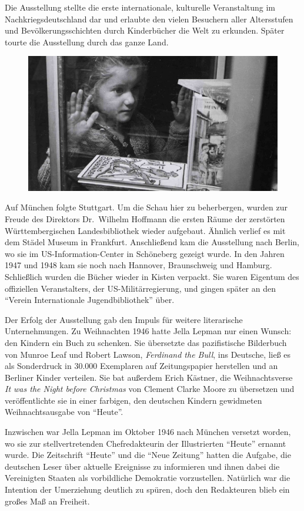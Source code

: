 \documentclass[a4paper,
fontsize=11pt,
oneside,
numbers=noperiodatend,
parskip=half-,
bibliography=totoc,
final
]{scrartcl}
\begin{document}
Die Ausstellung stellte die erste internationale, kulturelle
Veranstaltung im Nachkriegsdeutschland dar und erlaubte den vielen
Besuchern aller Altersstufen und Bevölkerungsschichten durch
Kinderbücher die Welt zu erkunden. Später tourte die Ausstellung durch
das ganze Land.~

\begin{figure}[htbp]
\centering
\includegraphics{img/bild5.jpg}
\end{figure}

Auf München folgte Stuttgart. Um die Schau hier zu beherbergen, wurden
zur Freude des Direktors Dr.~Wilhelm Hoffmann die ersten Räume der
zerstörten Württembergischen Landesbibliothek wieder aufgebaut. Ähnlich
verlief es mit dem Städel Museum in Frankfurt. Anschließend kam die
Ausstellung nach Berlin, wo sie im US-Information-Center in Schöneberg
gezeigt wurde. In den Jahren 1947 und 1948 kam sie noch nach Hannover,
Braunschweig und Hamburg. Schließlich wurden die Bücher wieder in Kisten
verpackt. Sie waren Eigentum des offiziellen Veranstalters, der
US-Militärregierung, und gingen später an den \enquote{Verein
Internationale Jugendbibliothek} über.

Der Erfolg der Ausstellung gab den Impuls für weitere literarische
Unternehmungen. Zu Weihnachten 1946 hatte Jella Lepman nur einen Wunsch:
den Kindern ein Buch zu schenken. Sie übersetzte das pazifistische
Bilderbuch von Munroe Leaf und Robert Lawson, \emph{Ferdinand the Bull},
ins Deutsche, ließ es als Sonderdruck in 30.000 Exemplaren auf
Zeitungspapier herstellen und an Berliner Kinder verteilen. Sie bat
außerdem Erich Kästner, die Weihnachtsverse \emph{It was the Night
before Christmas} von Clement Clarke Moore zu übersetzen und
veröffentlichte sie in einer farbigen, den deutschen Kindern gewidmeten
Weihnachtsausgabe von \enquote{Heute}.~

Inzwischen war Jella Lepman im Oktober 1946 nach München versetzt
worden, wo sie zur stellvertretenden Chefredakteurin der Illustrierten
\enquote{Heute} ernannt wurde. Die Zeitschrift \enquote{Heute} und die
\enquote{Neue Zeitung} hatten die Aufgabe, die deutschen Leser über
aktuelle Ereignisse zu informieren und ihnen dabei die Vereinigten
Staaten als vorbildliche Demokratie vorzustellen. Natürlich war die
Intention der Umerziehung deutlich zu spüren, doch den Redakteuren blieb
ein großes Maß an Freiheit.~
\end{document}
